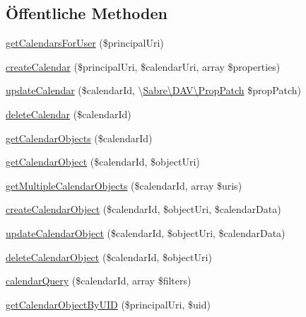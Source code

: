 \subsection*{Öffentliche Methoden}
\begin{DoxyCompactItemize}
\item 
\mbox{\hyperlink{interface_sabre_1_1_cal_d_a_v_1_1_backend_1_1_backend_interface_a41d069c48af0155b8e6e04bee46c70ba}{get\+Calendars\+For\+User}} (\$principal\+Uri)
\item 
\mbox{\hyperlink{interface_sabre_1_1_cal_d_a_v_1_1_backend_1_1_backend_interface_ac792d2e1791c49d7c895a1c8b9f3b60a}{create\+Calendar}} (\$principal\+Uri, \$calendar\+Uri, array \$properties)
\item 
\mbox{\hyperlink{interface_sabre_1_1_cal_d_a_v_1_1_backend_1_1_backend_interface_aee5f2b1f3631060205b16e69deb7f3c1}{update\+Calendar}} (\$calendar\+Id, \textbackslash{}\mbox{\hyperlink{class_sabre_1_1_d_a_v_1_1_prop_patch}{Sabre\textbackslash{}\+D\+A\+V\textbackslash{}\+Prop\+Patch}} \$prop\+Patch)
\item 
\mbox{\hyperlink{interface_sabre_1_1_cal_d_a_v_1_1_backend_1_1_backend_interface_a909fbc63f768c2bf8409416d3f24e898}{delete\+Calendar}} (\$calendar\+Id)
\item 
\mbox{\hyperlink{interface_sabre_1_1_cal_d_a_v_1_1_backend_1_1_backend_interface_aaa786269ba9eb1731fb659b67f684ac2}{get\+Calendar\+Objects}} (\$calendar\+Id)
\item 
\mbox{\hyperlink{interface_sabre_1_1_cal_d_a_v_1_1_backend_1_1_backend_interface_a8c082fae6a4008fc9c2fa43ae61b9833}{get\+Calendar\+Object}} (\$calendar\+Id, \$object\+Uri)
\item 
\mbox{\hyperlink{interface_sabre_1_1_cal_d_a_v_1_1_backend_1_1_backend_interface_a1ac65bc67e50edce9db902083d0ceb51}{get\+Multiple\+Calendar\+Objects}} (\$calendar\+Id, array \$uris)
\item 
\mbox{\hyperlink{interface_sabre_1_1_cal_d_a_v_1_1_backend_1_1_backend_interface_a338ac93ff39e5ed7a9330df875b9efa4}{create\+Calendar\+Object}} (\$calendar\+Id, \$object\+Uri, \$calendar\+Data)
\item 
\mbox{\hyperlink{interface_sabre_1_1_cal_d_a_v_1_1_backend_1_1_backend_interface_af27aef382054a5b2945673944439f716}{update\+Calendar\+Object}} (\$calendar\+Id, \$object\+Uri, \$calendar\+Data)
\item 
\mbox{\hyperlink{interface_sabre_1_1_cal_d_a_v_1_1_backend_1_1_backend_interface_a2bb33e6316187c3254fe38d3cf61e416}{delete\+Calendar\+Object}} (\$calendar\+Id, \$object\+Uri)
\item 
\mbox{\hyperlink{interface_sabre_1_1_cal_d_a_v_1_1_backend_1_1_backend_interface_aecd41f613576b9d7d6d16d3039c692ae}{calendar\+Query}} (\$calendar\+Id, array \$filters)
\item 
\mbox{\hyperlink{interface_sabre_1_1_cal_d_a_v_1_1_backend_1_1_backend_interface_ac9fc5b145a94ba67e0a4fe1fb6d82022}{get\+Calendar\+Object\+By\+U\+ID}} (\$principal\+Uri, \$uid)
\end{DoxyCompactItemize}


